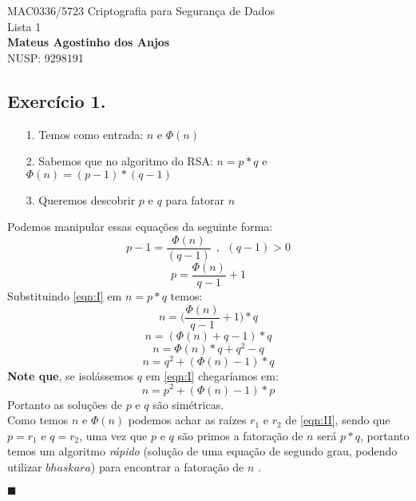 \documentclass[12pt]{article}
\newcommand{\newqed}{{\hfill\color{black}\ensuremath{\blacksquare}}}
\begin{document}
\begin{center}
{\Large MAC0336/5723 Criptografia para Segurança de Dados\\
Lista 1}\\
\textbf{Mateus Agostinho dos Anjos}\\
NUSP: 9298191
\end{center}

\vspace{0.4 cm}

\subsection*{Exercício 1.}
	\begin{itemize}
		\item[1. ]
			Temos como entrada:	 $n$ e $\Phi(n)$
		\item[2. ]	
			Sabemos que no algoritmo do RSA: $n = p * q$ e $\Phi(n) = (p-1)*(q-1)$
		\item[3. ]	
			Queremos descobrir $p$ e $q$	para fatorar $n$
	\end{itemize}
	Podemos manipular essas equações da seguinte forma:
	$$p - 1 = \frac{\Phi(n)}{(q - 1)}  \ \ , \ \  (q - 1) > 0$$
	\begin{equation}
		\label{eqn:I} \tag{I}
			p = \frac{\Phi(n)}{q - 1} + 1 
	\end{equation}
	Substituindo \eqref{eqn:I} em $n = p * q$ temos:
	$$ n = \Big(\frac{\Phi(n)}{q - 1} + 1\Big) * q $$
	$$ n = (\Phi(n) + q - 1) * q$$
	$$ n = \Phi(n)*q + q^2 - q$$
	\begin{equation}
		\label{eqn:II} \tag{II}
			 n = q^2 + (\Phi(n) - 1) * q
	\end{equation}
	\textbf{Note que}, se isolássemos $q$ em \eqref{eqn:I} chegaríamos em:
	$$n = p^2 + (\Phi(n) - 1) * p$$
	Portanto as soluções de $p$ e $q$ são simétricas.\\
	
	Como temos $n$ e $\Phi(n)$ podemos achar as raízes $r_1$ e $r_2$ de
	\eqref{eqn:II}, sendo que $p = r_1$ e $q = r_2$, uma vez que
	$p$ e $q$ são primos a fatoração de $n$ será $p * q$, portanto temos
	um algoritmo \textit{rápido} (solução de uma equação de segundo grau, podendo
	utilizar $bhaskara$) para encontrar a fatoração de $n$ .
	
	\newqed

\newpage	
\end{document}
